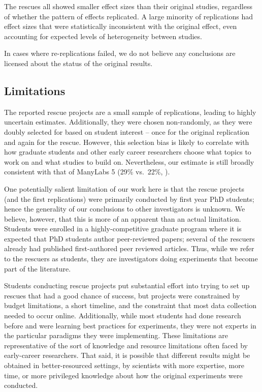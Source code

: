 \documentclass[
  english,
  a4paper,
]{article}
\begin{document}
The rescues all showed smaller effect sizes than their original studies, regardless of whether the pattern of effects replicated.
A large minority of replications had effect sizes that were statistically inconsistent with the original effect, even accounting for expected levels of heterogeneity between studies.

In cases where re-replications failed, we do not believe any conclusions are licensed about the status of the original results.

\subsection{Limitations}\label{limitations}

The reported rescue projects are a small sample of replications, leading to highly uncertain estimates.
Additionally, they were chosen non-randomly, as they were doubly selected for based on student interest -- once for the original replication and again for the rescue.
However, this selection bias is likely to correlate with how graduate students and other early career researchers choose what topics to work on and what studies to build on.
Nevertheless, our estimate is still broadly consistent with that of ManyLabs 5 (29\% vs.~22\%, ).

One potentially salient limitation of our work here is that the rescue projects (and the first replications) were primarily conducted by first year PhD students; hence the generality of our conclusions to other investigators is unknown. We believe, however, that this is more of an apparent than an actual limitation. Students were enrolled in a highly-competitive graduate program where it is expected that PhD students author peer-reviewed papers; several of the rescuers already had published first-authored peer reviewed articles. Thus, while we refer to the rescuers as students, they are investigators doing experiments that become part of the literature.

Students conducting rescue projects put substantial effort into trying to set up rescues that had a good chance of success, but projects were constrained by budget limitations, a short timeline, and the constraint that most data collection needed to occur online. Additionally, while most students had done research before and were learning best practices for experiments, they were not experts in the particular paradigms they were implementing. These limitations are representative of the sort of knowledge and resource limitations often faced by early-career researchers. That said, it is possible that different results might be obtained in better-resourced settings, by scientists with more expertise, more time, or more privileged knowledge about how the original experiments were conducted.
\end{document}
